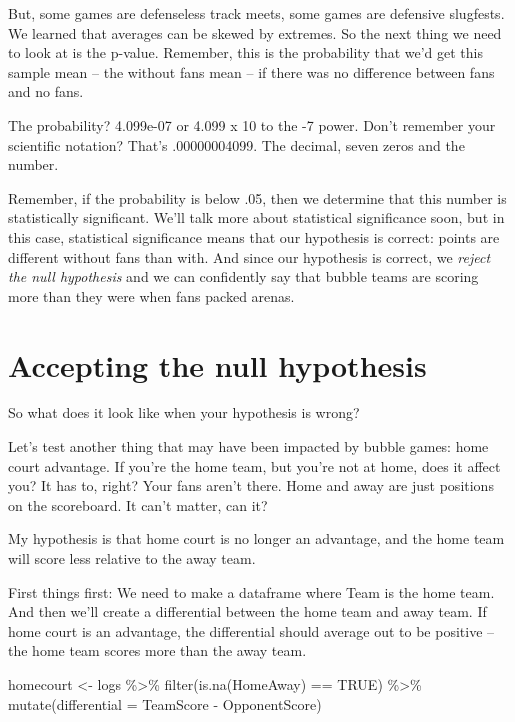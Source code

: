 \documentclass[
]{book}
\newenvironment{Shaded}{\begin{snugshade}}{\end{snugshade}}
\newcommand{\AttributeTok}[1]{\textcolor[rgb]{0.77,0.63,0.00}{#1}}
\newcommand{\ConstantTok}[1]{\textcolor[rgb]{0.00,0.00,0.00}{#1}}
\newcommand{\FunctionTok}[1]{\textcolor[rgb]{0.00,0.00,0.00}{#1}}
\newcommand{\NormalTok}[1]{#1}
\newcommand{\OtherTok}[1]{\textcolor[rgb]{0.56,0.35,0.01}{#1}}
\newcommand{\SpecialCharTok}[1]{\textcolor[rgb]{0.00,0.00,0.00}{#1}}
\begin{document}
But, some games are defenseless track meets, some games are defensive slugfests. We learned that averages can be skewed by extremes. So the next thing we need to look at is the p-value. Remember, this is the probability that we'd get this sample mean -- the without fans mean -- if there was no difference between fans and no fans.

The probability? 4.099e-07 or 4.099 x 10 to the -7 power. Don't remember your scientific notation? That's .00000004099. The decimal, seven zeros and the number.

Remember, if the probability is below .05, then we determine that this number is statistically significant. We'll talk more about statistical significance soon, but in this case, statistical significance means that our hypothesis is correct: points are different without fans than with. And since our hypothesis is correct, we \emph{reject the null hypothesis} and we can confidently say that bubble teams are scoring more than they were when fans packed arenas.

\hypertarget{accepting-the-null-hypothesis}{%
\section{Accepting the null hypothesis}\label{accepting-the-null-hypothesis}}

So what does it look like when your hypothesis is wrong?

Let's test another thing that may have been impacted by bubble games: home court advantage. If you're the home team, but you're not at home, does it affect you? It has to, right? Your fans aren't there. Home and away are just positions on the scoreboard. It can't matter, can it?

My hypothesis is that home court is no longer an advantage, and the home team will score less relative to the away team.

First things first: We need to make a dataframe where Team is the home team. And then we'll create a differential between the home team and away team. If home court is an advantage, the differential should average out to be positive -- the home team scores more than the away team.

\begin{Shaded}
\begin{Highlighting}[]
\NormalTok{homecourt }\OtherTok{\textless{}{-}}\NormalTok{ logs }\SpecialCharTok{\%\textgreater{}\%} \FunctionTok{filter}\NormalTok{(}\FunctionTok{is.na}\NormalTok{(HomeAway) }\SpecialCharTok{==} \ConstantTok{TRUE}\NormalTok{) }\SpecialCharTok{\%\textgreater{}\%} \FunctionTok{mutate}\NormalTok{(}\AttributeTok{differential =}\NormalTok{ TeamScore }\SpecialCharTok{{-}}\NormalTok{ OpponentScore)}
\end{Highlighting}
\end{Shaded}
\end{document}
